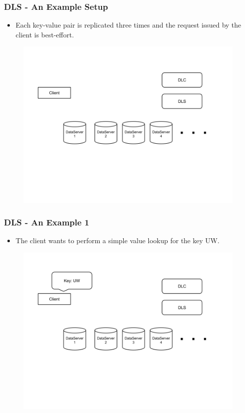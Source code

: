 \documentclass{beamer}
\begin{document}
\begin{frame}
  \frametitle{DLS - An Example Setup}
  \begin{itemize}
    \item Each key-value pair is replicated three times and the request issued
      by the client is best-effort.
  \end{itemize}
  \begin{figure}
    \begin{center}
      \centerline{\includegraphics[scale=0.40]{img/DLS_Example1.png}}
    \end{center}
  \end{figure}
\end{frame}


\begin{frame}
  \frametitle{DLS - An Example 1}
  \begin{itemize}
    \item The client wants to perform a simple value lookup for the key UW.
  \end{itemize}
  \begin{figure}
    \begin{center}
      \centerline{\includegraphics[scale=0.40]{img/DLS_Example2.png}}
    \end{center}
  \end{figure}
\end{frame}
\end{document}
